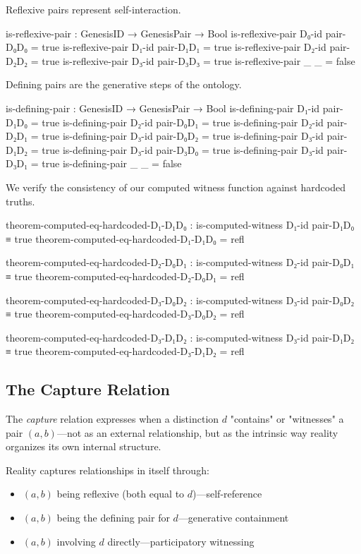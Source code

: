 \documentclass[11pt,a4paper]{book}
\begin{document}
Reflexive pairs represent self-interaction.

\begin{code}
is-reflexive-pair : GenesisID → GenesisPair → Bool
is-reflexive-pair D₀-id pair-D₀D₀ = true
is-reflexive-pair D₁-id pair-D₁D₁ = true
is-reflexive-pair D₂-id pair-D₂D₂ = true
is-reflexive-pair D₃-id pair-D₃D₃ = true
is-reflexive-pair _     _         = false
\end{code}

Defining pairs are the generative steps of the ontology.

\begin{code}
is-defining-pair : GenesisID → GenesisPair → Bool
is-defining-pair D₁-id pair-D₁D₀ = true
is-defining-pair D₂-id pair-D₀D₁ = true
is-defining-pair D₂-id pair-D₂D₁ = true
is-defining-pair D₃-id pair-D₀D₂ = true
is-defining-pair D₃-id pair-D₁D₂ = true
is-defining-pair D₃-id pair-D₃D₀ = true
is-defining-pair D₃-id pair-D₃D₁ = true
is-defining-pair _     _         = false

\end{code}

We verify the consistency of our computed witness function against hardcoded truths.

\begin{code}
theorem-computed-eq-hardcoded-D₁-D₁D₀ : is-computed-witness D₁-id pair-D₁D₀ ≡ true
theorem-computed-eq-hardcoded-D₁-D₁D₀ = refl

theorem-computed-eq-hardcoded-D₂-D₀D₁ : is-computed-witness D₂-id pair-D₀D₁ ≡ true
theorem-computed-eq-hardcoded-D₂-D₀D₁ = refl

theorem-computed-eq-hardcoded-D₃-D₀D₂ : is-computed-witness D₃-id pair-D₀D₂ ≡ true
theorem-computed-eq-hardcoded-D₃-D₀D₂ = refl

theorem-computed-eq-hardcoded-D₃-D₁D₂ : is-computed-witness D₃-id pair-D₁D₂ ≡ true
theorem-computed-eq-hardcoded-D₃-D₁D₂ = refl

\end{code}

\subsection{The Capture Relation}

The \emph{capture} relation expresses when a distinction $d$ "contains" or "witnesses" a pair $(a, b)$—not as an external relationship, but as the intrinsic way reality organizes its own internal structure.

Reality captures relationships in itself through:
\begin{itemize}
\item $(a, b)$ being reflexive (both equal to $d$)—self-reference
\item $(a, b)$ being the defining pair for $d$—generative containment
\item $(a, b)$ involving $d$ directly—participatory witnessing
\end{itemize}
\end{document}
